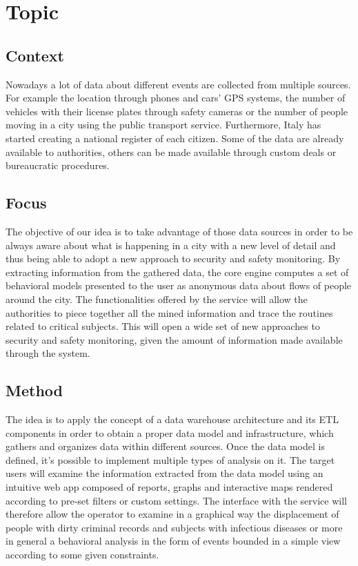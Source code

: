 \documentclass[../main.tex]{subfiles}
\begin{document}
    \chapter{Topic}\label{ch:topic}


    \section{Context}\label{sec:context}
    Nowadays a lot of data about different events are collected from multiple sources. For example the location through phones and cars’ GPS systems, the number of vehicles with their license plates through safety cameras or the number of people moving in a city using the public transport service. Furthermore, Italy has started creating a national register of each citizen. Some of the data are already available to authorities, others can be made available through custom deals or bureaucratic procedures.


    \section{Focus}\label{sec:focus}
    The objective of our idea is to take advantage of those data sources in order to be always aware about what is happening in a city with a new level of detail and thus being able to adopt a new approach to security and safety monitoring. By extracting information from the gathered data, the core engine computes a set of behavioral models presented to the user as anonymous data about flows of people around the city. The functionalities offered by the service will allow the authorities to piece together all the mined information and trace the routines related to critical subjects. This will open a wide set of new approaches to security and safety monitoring, given the amount of information made available through the system.


    \section{Method}\label{sec:method}
    The idea is to apply the concept of a data warehouse architecture and its ETL components in order to obtain a proper data model and infrastructure, which gathers and organizes data within different sources.
    Once the data model is defined, it’s possible to implement multiple types of analysis on it.
    The target users will examine the information extracted from the data model using an intuitive web app composed of reports, graphs and interactive maps rendered according to pre-set filters or custom settings. The interface with the service will therefore allow the operator to examine in a graphical way the displacement of people with dirty criminal records and subjects with infectious diseases or more in general a behavioral analysis in the form of events bounded in a simple view according to some given constraints.
\end{document}
